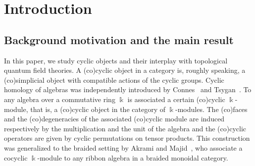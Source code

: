 \documentclass[pdftex]{sigma}
\numberwithin{equation}{section}
\newcommand{\kk}{\Bbbk}
\begin{document}
\allowdisplaybreaks

\newcommand{\arXivNumber}{2306.07216}

\renewcommand{\PaperNumber}{074}

\FirstPageHeading










\section{Introduction}

\subsection{Background motivation and the main result} In this paper, we study cyclic objects and their interplay with topological quantum field theories.
A (co)cyclic object in a category is, roughly speaking, a (co)simplicial object with
compatible actions of the cyclic groups. Cyclic homology of algebras was independently introduced by Connes~\cite{connes_non-commutative_1985} and Tsygan~\cite{tsygan}. To any algebra over a commutative ring $\kk$ is associated a certain (co)cyclic $\kk$-module, that is, a (co)cyclic object in the category of $\kk$-modules. The (co)faces and the (co)degeneracies of the associated (co)cyclic module are induced respectively by the multiplication and the unit of the algebra and the (co)cyclic operators are given by cyclic permutations on tensor products.
This construction was generalized to the braided setting by Akrami and Majid~\cite{cycliccocycles}, who associate a cocyclic $\kk$-module to any ribbon algebra in a braided monoidal category.
\end{document}
